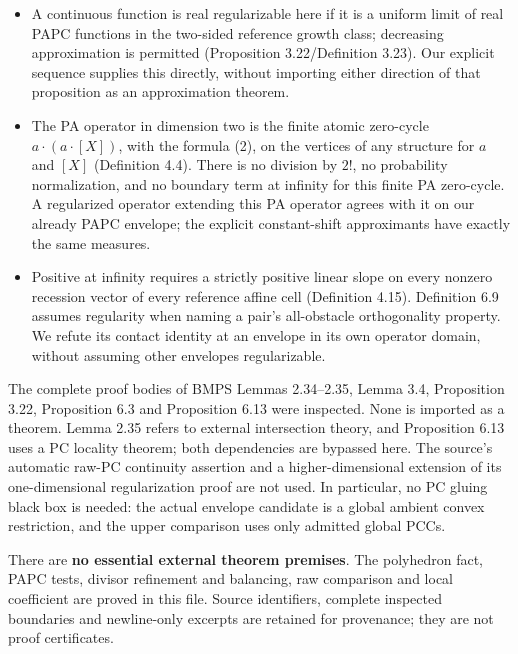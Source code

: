 \documentclass[
  10pt,
]{article}
\begin{document}
\begin{itemize}
\[  P_\gamma(u)(x)=\sup\{q(x):q\in\mathrm{PC}(X),\ q\leq\gamma+u,
                    \ q\leq\gamma+C_q\text{ for some constant }C_q\}.
  \] Competitors have only the displayed upper growth requirement
  (Definition 6.2).
\item
  A continuous function is real regularizable here if it is a uniform
  limit of real PAPC functions in the two-sided reference growth class;
  decreasing approximation is permitted (Proposition 3.22/Definition
  3.23). Our explicit sequence supplies this directly, without importing
  either direction of that proposition as an approximation theorem.
\item
  The PA operator in dimension two is the finite atomic zero-cycle
  \(a\cdot(a\cdot[X])\), with the formula (2), on the vertices of any
  structure for \(a\) and \([X]\) (Definition 4.4). There is no division
  by \(2!\), no probability normalization, and no boundary term at
  infinity for this finite PA zero-cycle. A regularized operator
  extending this PA operator agrees with it on our already PAPC
  envelope; the explicit constant-shift approximants have exactly the
  same measures.
\item
  Positive at infinity requires a strictly positive linear slope on
  every nonzero recession vector of every reference affine cell
  (Definition 4.15). Definition 6.9 assumes regularity when naming a
  pair's all-obstacle orthogonality property. We refute its contact
  identity at an envelope in its own operator domain, without assuming
  other envelopes regularizable.
\end{itemize}

The complete proof bodies of BMPS Lemmas 2.34--2.35, Lemma 3.4,
Proposition 3.22, Proposition 6.3 and Proposition 6.13 were inspected.
None is imported as a theorem. Lemma 2.35 refers to external
intersection theory, and Proposition 6.13 uses a PC locality theorem;
both dependencies are bypassed here. The source's automatic raw-PC
continuity assertion and a higher-dimensional extension of its
one-dimensional regularization proof are not used. In particular, no PC
gluing black box is needed: the actual envelope candidate is a global
ambient convex restriction, and the upper comparison uses only admitted
global PCCs.

There are \textbf{no essential external theorem premises}. The
polyhedron fact, PAPC tests, divisor refinement and balancing, raw
comparison and local coefficient are proved in this file. Source
identifiers, complete inspected boundaries and newline-only excerpts are
retained for provenance; they are not proof certificates.
\end{document}
